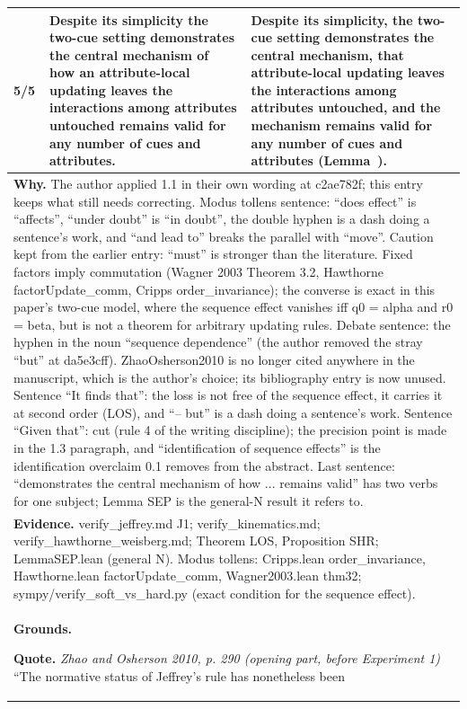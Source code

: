 \documentclass[10pt]{article}
\theoremstyle{definition}
\renewcommand{\ref}[1]{\textsc{\detokenize{#1}}}
\newlength{\fullw}\setlength{\fullw}{25.9cm}
\begin{document}
{\begin{longtable}{|p{0.9cm}|p{12.2cm}|p{12.2cm}|}
5/5 & Despite its simplicity the two-cue setting demonstrates the central mechanism of how an attribute-local updating leaves the interactions among attributes untouched remains valid for any number of cues and attributes. & Despite its simplicity, the two-cue setting demonstrates the central mechanism, that attribute-local updating leaves the interactions among attributes untouched, and the mechanism remains valid for any number of cues and attributes (Lemma~\ref{lem:SEP}). \\ \hline
\multicolumn{3}{|p{\fullw}|}{\textbf{Why.} The author applied 1.1 in their own wording at c2ae782f; this entry keeps what still needs correcting. Modus tollens sentence: ``does effect'' is ``affects'', ``under doubt'' is ``in doubt'', the double hyphen is a dash doing a sentence's work, and ``and lead to'' breaks the parallel with ``move''. Caution kept from the earlier entry: ``must'' is stronger than the literature. Fixed factors imply commutation (Wagner 2003 Theorem 3.2, Hawthorne factorUpdate\_comm, Cripps order\_invariance); the converse is exact in this paper's two-cue model, where the sequence effect vanishes iff q0 = alpha and r0 = beta, but is not a theorem for arbitrary updating rules. Debate sentence: the hyphen in the noun ``sequence dependence'' (the author removed the stray ``but'' at da5e3cff). ZhaoOsherson2010 is no longer cited anywhere in the manuscript, which is the author's choice; its bibliography entry is now unused. Sentence ``It finds that'': the loss is not free of the sequence effect, it carries it at second order (LOS), and ``-- but'' is a dash doing a sentence's work. Sentence ``Given that'': cut (rule 4 of the writing discipline); the precision point is made in the 1.3 paragraph, and ``identification of sequence effects'' is the identification overclaim 0.1 removes from the abstract. Last sentence: ``demonstrates the central mechanism of how ... remains valid'' has two verbs for one subject; Lemma SEP is the general-N result it refers to.} \\
\multicolumn{3}{|p{\fullw}|}{\textbf{Evidence.} verify\_jeffrey.md J1; verify\_kinematics.md; verify\_hawthorne\_weisberg.md; Theorem LOS, Proposition SHR; LemmaSEP.lean (general N). Modus tollens: Cripps.lean order\_invariance, Hawthorne.lean factorUpdate\_comm, Wagner2003.lean thm32; sympy/verify\_soft\_vs\_hard.py (exact condition for the sequence effect).} \\ \hline
\multicolumn{3}{|p{\fullw}|}{\textbf{Grounds.}\par \textbf{Quote.} \textit{Zhao and Osherson 2010, p. 290 (opening part, before Experiment 1)} \newline ``The normative status of Jeffrey's rule has nonetheless been
}
\end{longtable}}
\end{document}
